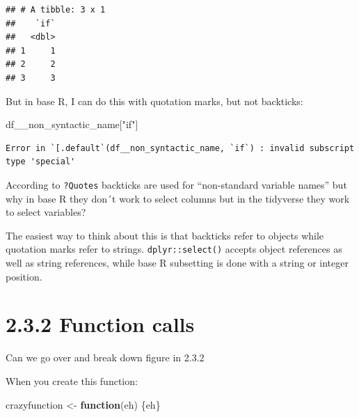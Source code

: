 \documentclass[]{book}
\newenvironment{Shaded}{\begin{snugshade}}{\end{snugshade}}
\newcommand{\ControlFlowTok}[1]{\textcolor[rgb]{0.13,0.29,0.53}{\textbf{#1}}}
\newcommand{\DataTypeTok}[1]{\textcolor[rgb]{0.13,0.29,0.53}{#1}}
\newcommand{\KeywordTok}[1]{\textcolor[rgb]{0.13,0.29,0.53}{\textbf{#1}}}
\newcommand{\NormalTok}[1]{#1}
\newcommand{\OperatorTok}[1]{\textcolor[rgb]{0.81,0.36,0.00}{\textbf{#1}}}
\newcommand{\StringTok}[1]{\textcolor[rgb]{0.31,0.60,0.02}{#1}}
\begin{document}
\begin{verbatim}
## # A tibble: 3 x 1
##    `if`
##   <dbl>
## 1     1
## 2     2
## 3     3
\end{verbatim}

\begin{Shaded}
\end{Shaded}

But in base R, I can do this with quotation marks, but not backticks:

\begin{Shaded}
\begin{Highlighting}[]
\NormalTok{df__non_syntactic_name[}\StringTok{"if"}\NormalTok{]}
\end{Highlighting}
\end{Shaded}

\begin{verbatim}
Error in `[.default`(df__non_syntactic_name, `if`) : invalid subscript type 'special'
\end{verbatim}

According to \texttt{?Quotes} backticks are used for ``non-standard variable names'' but why in base R they don´t work to select columns but in the tidyverse they work to select variables?

The easiest way to think about this is that backticks refer to objects while quotation marks refer to strings. \texttt{dplyr::select()} accepts object references as well as string references, while base R subsetting is done with a string or integer position.

\hypertarget{function-calls}{%
\section*{2.3.2 Function calls}\label{function-calls}}

Can we go over and break down figure in 2.3.2

When you create this function:

\begin{Shaded}
\begin{Highlighting}[]
\NormalTok{crazyfunction <-}\StringTok{ }\ControlFlowTok{function}\NormalTok{(eh) \{eh\}}
\end{Highlighting}
\end{Shaded}
\end{document}
